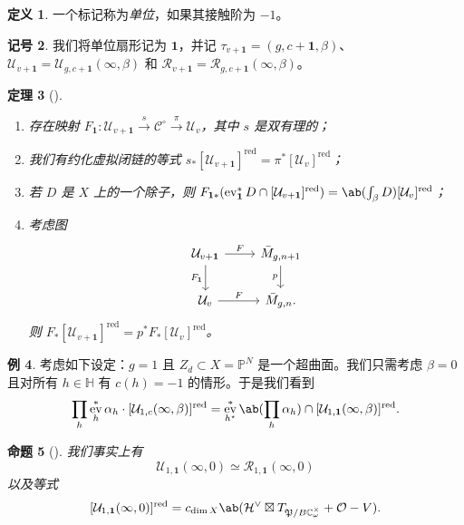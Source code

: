 \documentclass{amsart}
\newtheorem{thm}{定理}[section]
\newtheorem{prop}[thm]{命题}
\theoremstyle{definition}
\newtheorem{defn}[thm]{定义}
\newtheorem{exm}[thm]{例}
\newtheorem{notn}[thm]{记号}
\theoremstyle{remark}
\theoremstyle{plain}
\theoremstyle{definition}
\theoremstyle{remark}
\newcommand{\C}{\mathbb{C}}
\renewcommand{\H}{\mathbb{H}}
\renewcommand{\P}{\mathbb{P}}
\newcommand{\mc}[1]{\mathcal{#1}}
\newcommand{\mf}[1]{\mathfrak{#1}}
\newcommand{\mr}[1]{\mathrm{#1}}
\newcommand{\on}[1]{\operatorname{#1}}
\newcommand{\1}{\mathbf{1}}
\newcommand{\2}{\mathbf{2}}
\newcommand{\3}{\mathbf{3}}
\DeclareMathOperator{\ev}{ev}
\begin{document}
\begin{defn}
    一个标记称为\textit{单位}，如果其接触阶为 \(-1\)。
\end{defn}

\begin{notn}
    我们将单位扇形记为 \(\1\)，并记 \(\tau_{v+\1} = (g, c+\1, \beta)\)、\(\mc{U}_{v+\1} = \mc{U}_{g, c+\1}(\infty, \beta)\) 和 \(\mc{R}_{v+\1} = \mc{R}_{g, c+\1}(\infty, \beta)\)。
\end{notn}

\begin{thm}[{\cite[定理~1.16--1.17]{CJRpunctured}}]\leavevmode
    \begin{enumerate}
        \item 存在映射 \(F_{\1} \colon \mc{U}_{v+\1} \xrightarrow{s} \mc{C}^{\circ} \xrightarrow{\pi} \mc{U}_v\)，其中 \(s\) 是双有理的；
        \item 我们有约化虚拟闭链的等式 \(s_* [\mc{U}_{v+\1}]^{\on{red}} = \pi^* [\mc{U}_v]^{\on{red}}\)；
        \item 若 \(D\) 是 \(X\) 上的一个除子，则 \(F_{\1 *} (\ev_{\1}^* D \cap [\mc{U}_{v+\1}]^{\on{red}}) = \ab(\int_{\beta} D) [\mc{U}_v]^{\on{red}}\)； 
        \item 考虑图
            \begin{equation*}
            \begin{tikzcd}
                \mc{U}_{v+\1} \ar{r}{F} \ar{d}[swap]{F_{\1}} & \bar{M}_{g,n+1} \ar{d}[swap]{p} \\
                \mc{U}_v \ar{r}{F} & \bar{M}_{g,n}.
            \end{tikzcd}
            \end{equation*}
            则 \(F_* [\mc{U}_{v+\1}]^{\on{red}} = p^* F_* [\mc{U}_v]^{\on{red}}\)。
    \end{enumerate}
\end{thm}

\begin{exm}
    考虑如下设定：\(g = 1\) 且 \(Z_d \subset X = \P^N\) 是一个超曲面。我们只需考虑 \(\beta = 0\) 且对所有 \(h \in \H\) 有 \(c(h) = -1\) 的情形。于是我们看到
    \[ \prod_h \ev_h^* \alpha_h \cdot [\mc{U}_{1,c}(\infty,\beta)]^{\mr{red}} = \ev_{h^{\star}}^* \ab(\prod_h \alpha_h) \cap [\mc{U}_{1,\1}(\infty,\beta)]^{\on{red}}. \]
\end{exm}

\begin{prop}[{\cite{CJRpunctured}}]
    我们事实上有
    \[ \mc{U}_{1,\1}(\infty, 0) \simeq \mc{R}_{1,\1}(\infty, 0) \]
    以及等式
    \[ [\mc{U}_{1,\1}(\infty, 0)]^{\on{red}} = c_{\dim X} \ab(\mc{H}^{\vee} \boxtimes T_{\mf{P}/B\C_{\omega}^{\times}} + \mc{O} - V). \]
\end{prop}
\end{document}
